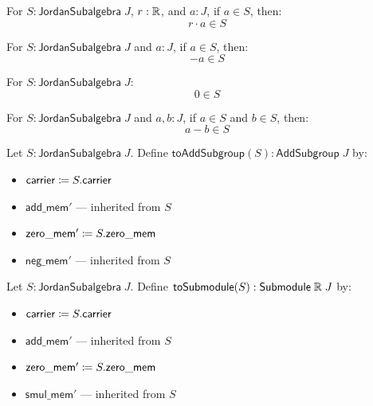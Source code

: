 \begin{theorem}
For $S : \mathsf{JordanSubalgebra}\;J$, $r : \mathbb{R}$, and $a : J$, if $a \in S$, then:
\[ r \cdot a \in S \]
\end{theorem}

\begin{theorem}
For $S : \mathsf{JordanSubalgebra}\;J$ and $a : J$, if $a \in S$, then:
\[ -a \in S \]
\end{theorem}

\begin{theorem}
For $S : \mathsf{JordanSubalgebra}\;J$:
\[ 0 \in S \]
\end{theorem}

\begin{theorem}
For $S : \mathsf{JordanSubalgebra}\;J$ and $a, b : J$, if $a \in S$ and $b \in S$, then:
\[ a - b \in S \]
\end{theorem}

\begin{definition}[toAddSubgroup]
Let $S : \mathsf{JordanSubalgebra}\;J$. Define $\mathsf{toAddSubgroup}(S) : \mathsf{AddSubgroup}\;J$ by:
\begin{itemize}
  \item $\mathsf{carrier} \coloneqq S.\mathsf{carrier}$
  \item $\mathsf{add\_mem'}$ --- inherited from $S$
  \item $\mathsf{zero\_mem'} \coloneqq S.\mathsf{zero\_mem}$
  \item $\mathsf{neg\_mem'}$ --- inherited from $S$
\end{itemize}
\end{definition}

\begin{definition}[toSubmodule]
Let $S : \mathsf{JordanSubalgebra}\;J$. Define $\mathsf{toSubmodule}(S) : \mathsf{Submodule}\;\mathbb{R}\;J$ by:
\begin{itemize}
  \item $\mathsf{carrier} \coloneqq S.\mathsf{carrier}$
  \item $\mathsf{add\_mem'}$ --- inherited from $S$
  \item $\mathsf{zero\_mem'} \coloneqq S.\mathsf{zero\_mem}$
  \item $\mathsf{smul\_mem'}$ --- inherited from $S$
\end{itemize}
\end{definition}
